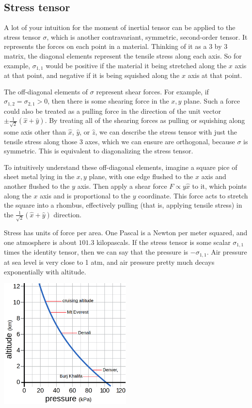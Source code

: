 \documentclass{article}
\begin{document}
\subsection{Stress tensor}
A lot of your intuition for the moment of inertial tensor can be applied to the stress tensor $\sigma$, which is another contravariant, symmetric, second-order tensor. It represents the forces on each point in a material. Thinking of it as a 3 by 3 matrix, the diagonal elements represent the tensile stress along each axis. So for example, $\sigma_{1,1}$ would be positive if the material it being stretched along the $x$ axis at that point, and negative if it is being squished along the $x$ axis at that point.
\par
The off-diagonal elements of $\sigma$ represent shear forces. For example, if $\sigma_{1,2} = \sigma_{2,1} > 0$, then there is some shearing force in the $x,y$ plane. Such a force could also be treated as a pulling force in the direction of the unit vector $\pm \frac{1}{\sqrt{2}} (\hat{x} + \hat{y})$. By treating all of the shearing forces as pulling or squishing along some axis other than $\hat{x}$, $\hat{y}$, or $\hat{z}$, we can describe the stress tensor with just the tensile stress along those 3 axes, which we can ensure are orthogonal, because $\sigma$ is symmetric. This is equivalent to diagonalizing the stress tensor.
\par
To intuitively understand these off-diagonal elements, imagine a square pice of sheet metal lying in the $x,y$ plane, with one edge flushed to the $x$ axis and another flushed to the $y$ axis. Then apply a shear force $F \propto y \hat{x}$ to it, which points along the $x$ axis and is proportional to the $y$ coordinate. This force acts to stretch the square into a rhombus, effectively pulling (that is, applying tensile stress) in the $\frac{1}{\sqrt{2}} (\hat{x} + \hat{y})$ direction.
\par
Stress has units of force per area. One Pascal is a Newton per meter squared, and one atmosphere is about $101.3$ kilopascals. If the stress tensor is some scalar $\sigma_{1,1}$ times the identity tensor, then we can say that the pressure is $-\sigma_{1,1}$. Air pressure at sea level is very close to 1 atm, and air pressure pretty much decays exponentially with altitude.
\begin{center}
    \includegraphics[width=0.5\textwidth]{pressure.png}
\end{center}
\end{document}
